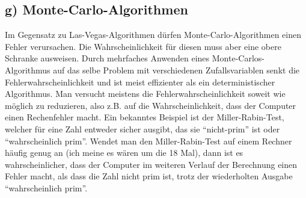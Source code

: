 \documentclass[a4paper,11pt,twoside]{article}
\begin{document}
\subsection*{g) Monte-Carlo-Algorithmen}
Im Gegensatz zu Las-Vegas-Algorithmen dürfen Monte-Carlo-Algorithmen einen Fehler verursachen. Die Wahrscheinlichkeit für diesen muss aber eine obere Schranke ausweisen. Durch mehrfaches Anwenden eines Monte-Carlos-Algorithmus auf das selbe Problem mit verschiedenen Zufallsvariablen senkt die Fehlerwahrscheinlichkeit und ist meist effizienter als ein deterministischer Algorithmus. Man versucht meistens die Fehlerwahrscheinlichkeit soweit wie möglich zu reduzieren, also z.B. auf die Wahrscheinlichkeit, dass der Computer einen Rechenfehler macht. Ein bekanntes Beispiel ist der Miller-Rabin-Test, welcher für eine Zahl entweder sicher ausgibt, das sie "`nicht-prim"' ist oder "`wahrscheinlich prim"'. Wendet man den Miller-Rabin-Test auf einem Rechner häufig genug an (ich meine es wären um die 18 Mal), dann ist es wahrscheinlicher, dass der Computer im weiteren Verlauf der Berechnung einen Fehler macht, als dass die Zahl nicht prim ist, trotz der wiederholten Ausgabe "`wahrscheinlich prim"'.
\end{document}
